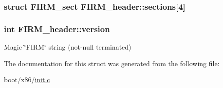 \subsubsection[{sections}]{\setlength{\rightskip}{0pt plus 5cm}struct {\bf F\+I\+R\+M\+\_\+sect} F\+I\+R\+M\+\_\+header\+::sections\mbox{[}4\mbox{]}}\label{struct_f_i_r_m__header_a685b6a1c1a0cfb8fb0f1dfcba06b9741}
\hypertarget{struct_f_i_r_m__header_a3a3ccecb2f6348d0071ce98d102e8a22}{}
\subsubsection[{version}]{\setlength{\rightskip}{0pt plus 5cm}int F\+I\+R\+M\+\_\+header\+::version}\label{struct_f_i_r_m__header_a3a3ccecb2f6348d0071ce98d102e8a22}


Magic \char`\"{}\+F\+I\+R\+M\char`\"{} string (not-\/null terminated) 



The documentation for this struct was generated from the following file\+:\begin{DoxyCompactItemize}
\item 
boot/x86/\hyperlink{init_8c}{init.\+c}\end{DoxyCompactItemize}
